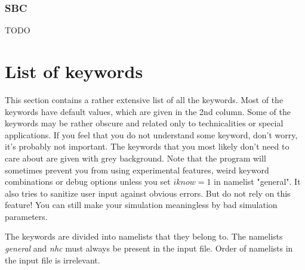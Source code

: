 \documentclass[12pt,a4paper]{article}
\begin{document}

\subsubsection{SBC}
TODO 

\section{List of keywords}
This section contains a rather extensive list of all the keywords. 
Most of the keywords have default values, which are given in the 2nd column. 
Some of the keywords may be rather obscure and related only to technicalities or special applications.
If you feel that you do not understand some keyword, don't worry, it's probably not important.
The keywords that you most likely don't need to care about are given with \colorbox{black!20}{grey background}.
Note that the program will sometimes prevent you from using experimental features, weird keyword combinations
or debug options unless you set $ iknow=1 $ in namelist "general". It also tries to sanitize user input against obvious errors.
But do not rely on this feature! You can still make your simulation meaningless by bad simulation parameters.

The keywords are divided into namelists that they belong to.
The namelists \textit{general} and \textit{nhc} must always be present in the input file.
Order of namelists in the input file is irrelevant.
\end{document}
